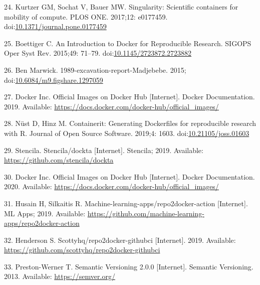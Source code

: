 \documentclass[10pt,letterpaper]{article}
\begin{document}
\leavevmode\hypertarget{ref-kurtzer_singularity_2017}{}%
24. Kurtzer GM, Sochat V, Bauer MW. Singularity: Scientific containers
for mobility of compute. PLOS ONE. 2017;12: e0177459.
doi:\href{https://doi.org/10.1371/journal.pone.0177459}{10.1371/journal.pone.0177459}

\leavevmode\hypertarget{ref-boettiger_introduction_2015}{}%
25. Boettiger C. An Introduction to Docker for Reproducible Research.
SIGOPS Oper Syst Rev. 2015;49: 71--79.
doi:\href{https://doi.org/10.1145/2723872.2723882}{10.1145/2723872.2723882}

\leavevmode\hypertarget{ref-marwick_madjebebe_2015}{}%
26. Ben Marwick. 1989-excavation-report-Madjebebe. 2015;
doi:\href{https://doi.org/10.6084/m9.figshare.1297059}{10.6084/m9.figshare.1297059}

\leavevmode\hypertarget{ref-docker_inc_official_2019}{}%
27. Docker Inc. Official Images on Docker Hub {[}Internet{]}. Docker
Documentation. 2019. Available:
\url{https://docs.docker.com/docker-hub/official_images/}

\leavevmode\hypertarget{ref-nust_containerit_2019}{}%
28. Nüst D, Hinz M. Containerit: Generating Dockerfiles for reproducible
research with R. Journal of Open Source Software. 2019;4: 1603.
doi:\href{https://doi.org/10.21105/joss.01603}{10.21105/joss.01603}

\leavevmode\hypertarget{ref-stencila_dockta_2019}{}%
29. Stencila. Stencila/dockta {[}Internet{]}. Stencila; 2019. Available:
\url{https://github.com/stencila/dockta}

\leavevmode\hypertarget{ref-docker_inc_official_2020}{}%
30. Docker Inc. Official Images on Docker Hub {[}Internet{]}. Docker
Documentation. 2020. Available:
\url{https://docs.docker.com/docker-hub/official_images/}

\leavevmode\hypertarget{ref-husain_repo2docker-action_2019}{}%
31. Husain H, Silkaitis R. Machine-learning-apps/repo2docker-action
{[}Internet{]}. ML Apps; 2019. Available:
\url{https://github.com/machine-learning-apps/repo2docker-action}

\leavevmode\hypertarget{ref-scottyhq_repo2docker-githubci_2019}{}%
32. Henderson S. Scottyhq/repo2docker-githubci {[}Internet{]}. 2019.
Available: \url{https://github.com/scottyhq/repo2docker-githubci}

\leavevmode\hypertarget{ref-preston-werner_semantic_2013}{}%
33. Preston-Werner T. Semantic Versioning 2.0.0 {[}Internet{]}. Semantic
Versioning. 2013. Available: \url{https://semver.org/}
\end{document}
